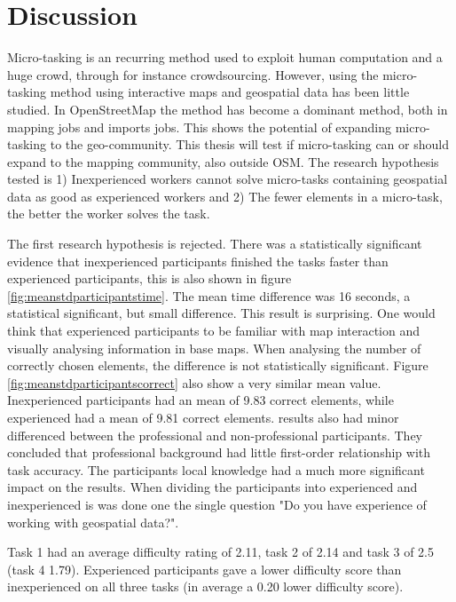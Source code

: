 \chapter{Discussion}
Micro-tasking is an recurring method used to exploit human computation and a huge crowd, through for instance crowdsourcing. However, using the micro-tasking method using interactive maps and geospatial data has been little studied. In OpenStreetMap the method has become a dominant method, both in mapping jobs and imports jobs. This shows the potential of expanding micro-tasking to the geo-community. This thesis will test if micro-tasking can or should expand to the mapping community, also outside OSM. The research hypothesis tested is 1) Inexperienced workers cannot solve micro-tasks containing geospatial data as good as experienced workers and 2) The fewer elements in a micro-task, the better the worker solves the task. 

The first research hypothesis is rejected. There was a statistically significant evidence that inexperienced participants finished the tasks faster than experienced participants, this is also shown in figure \ref{fig:meanstdparticipantstime}. The mean time difference was 16 seconds, a statistical significant, but small difference. This result is surprising. One would think that experienced participants to be familiar with map interaction and visually analysing information in base maps. When analysing the number of correctly chosen elements, the difference is not statistically significant. Figure \ref{fig:meanstdparticipantscorrect} also show a very similar mean value. Inexperienced participants had an mean of 9.83 correct elements, while experienced had a mean of 9.81 correct elements. \cite{Salk2016} results also had minor differenced between the professional and non-professional participants. They concluded that professional background had little first-order relationship with task accuracy. The participants local knowledge had a much more significant impact on the results. When dividing the participants into experienced and inexperienced is was done one the single question "Do you have experience of working with geospatial data?". 

Task 1 had an average difficulty rating of 2.11, task 2 of 2.14 and task 3 of 2.5 (task 4 1.79). Experienced participants gave a lower difficulty score than inexperienced on all three tasks (in average a 0.20 lower difficulty score).

